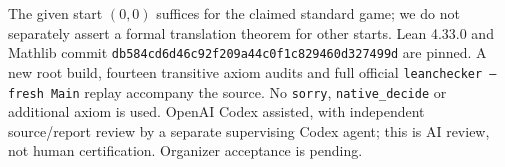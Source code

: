 \documentclass[11pt]{article}
\begin{document}
The given start $(0,0)$ suffices for the claimed standard game; we do
not separately assert a formal translation theorem for other starts.
Lean 4.33.0 and Mathlib commit
\texttt{db584cd6d46c92f209a44c0f1c829460d327499d} are pinned.
A new root build, fourteen transitive axiom audits and full official
\texttt{leanchecker --fresh Main} replay accompany the source.
No \texttt{sorry}, \texttt{native\_decide} or additional axiom is used.
OpenAI Codex assisted, with independent source/report review by a
separate supervising Codex agent; this is AI review, not human
certification. Organizer acceptance is pending.
\end{document}
